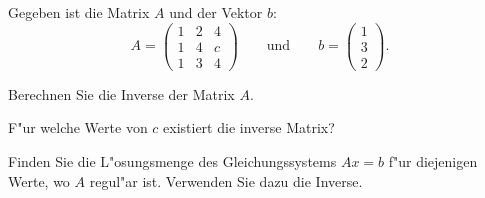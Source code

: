 Gegeben ist die Matrix $A$ und der Vektor $b$:
\[
A
=
\begin{pmatrix}
1&2&4\\
1&4&c\\
1&3&4
\end{pmatrix}
\qquad
\text{und}
\qquad
b=\begin{pmatrix}1\\3\\2\end{pmatrix}.
\]
\begin{teilaufgaben}
\item
Berechnen Sie die Inverse der Matrix $A$.
\item
F"ur welche Werte von $c$ existiert die inverse Matrix?
\item
Finden Sie die L"osungsmenge des Gleichungssystems $Ax=b$ f"ur diejenigen
Werte, wo $A$ regul"ar ist. Verwenden Sie dazu die Inverse.
\end{teilaufgaben}

